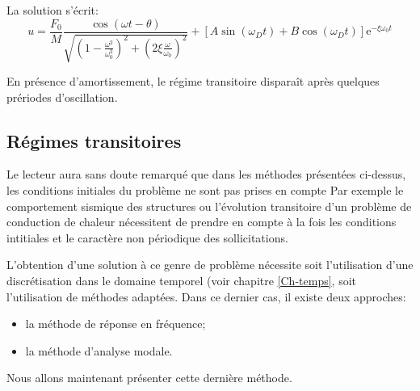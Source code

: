 La solution s'écrit:
\begin{equation}
u = \dfrac{F_0}M\dfrac{\cos(\omega t-\theta)}{\sqrt{\left(1-\frac{\omega^2}{\omega_0^2}\right)^2+\left(2\xi\frac{\omega}{\omega_0}\right)^2}}
+\left[A\sin (\omega_D t)+B\cos(\omega_D t)\right] \mathrm{e}^{-\xi\omega_0 t}
\end{equation}

\medskip
En présence d'amortissement, le régime transitoire disparaît après quelques prériodes d'oscillation.






\medskip{}
\subsection{Régimes transitoires}\label{Sec-RT}

Le lecteur aura sans doute remarqué que dans les méthodes présentées ci-dessus, 
les conditions initiales du problème ne sont pas prises en compte
Par exemple le comportement sismique des structures ou l'évolution transitoire d'un problème
de conduction de chaleur nécessitent de prendre en compte à la fois les conditions
intitiales et le caractère non périodique des sollicitations.

L'obtention d'une solution à ce genre de problème nécessite soit l'utilisation d'une discrétisation 
dans le domaine temporel (voir chapitre \ref{Ch-temps}, soit l'utilisation de méthodes adaptées. 
Dans ce dernier cas, il existe deux approches:
\begin{itemize}
   \item la méthode de réponse en fréquence;
   \item la méthode d'analyse modale.
\end{itemize}
Nous allons maintenant présenter cette dernière méthode.

\medskip

